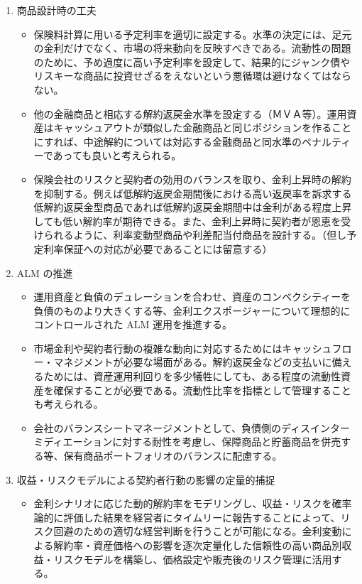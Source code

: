 \documentclass[report,gutter=10mm,fore-edge=10mm,uplatex,dvipdfmx]{jlreq}
\begin{document}
\begin{enumerate}
 \item 商品設計時の工夫
\begin{itemize}
 \item 保険料計算に用いる予定利率を適切に設定する。水準の決定には、足元の金利だけでなく、市場の将来動向を反映すべきである。流動性の問題のために、予め過度に高い予定利率を設定して、結果的にジャンク債やリスキーな商品に投資せざるをえないという悪循環は避けなくてはならない。
 \item 他の金融商品と相応する解約返戻金水準を設定する（ＭＶＡ等）。運用資産はキャッシュアウトが類似した金融商品と同じポジションを作ることにすれば、中途解約については対応する金融商品と同水準のペナルティーであっても良いと考えられる。
 \item 保険会社のリスクと契約者の効用のバランスを取り、金利上昇時の解約を抑制する。例えば低解約返戻金期間後における高い返戻率を訴求する低解約返戻金型商品であれば低解約返戻金期間中は金利がある程度上昇しても低い解約率が期待できる。また、金利上昇時に契約者が恩恵を受けられるように、利率変動型商品や利差配当付商品を設計する。（但し予定利率保証への対応が必要であることには留意する）
\end{itemize}
 \item ALM の推進
\begin{itemize}
 \item 運用資産と負債のデュレーションを合わせ、資産のコンベクシティーを負債のものより大きくする等、金利エクスポージャーについて理想的にコントロールされた ALM 運用を推進する。
 \item 市場金利や契約者行動の複雑な動向に対応するためにはキャッシュフロー・マネジメントが必要な場面がある。解約返戻金などの支払いに備えるためには、資産運用利回りを多少犠牲にしても、ある程度の流動性資産を確保することが必要である。流動性比率を指標として管理することも考えられる。
 \item 会社のバランスシートマネージメントとして、負債側のディスインターミディエーションに対する耐性を考慮し、保障商品と貯蓄商品を併売する等、保有商品ポートフォリオのバランスに配慮する。
\end{itemize}
 \item 収益・リスクモデルによる契約者行動の影響の定量的捕捉
\begin{itemize}
 \item 金利シナリオに応じた動的解約率をモデリングし、収益・リスクを確率論的に評価した結果を経営者にタイムリーに報告することによって、リスク回避のための適切な経営判断を行うことが可能になる。金利変動による解約率・資産価格への影響を逐次定量化した信頼性の高い商品別収益・リスクモデルを構築し、価格設定や販売後のリスク管理に活用する。

\end{itemize}
\end{enumerate}
\end{document}

